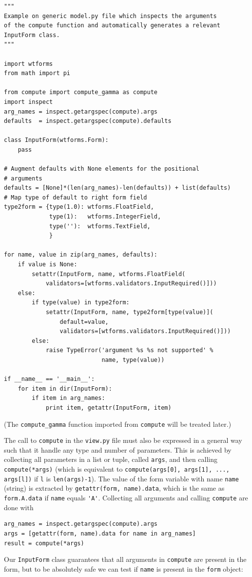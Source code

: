 \documentclass[%
oneside,                 %
final,                   %
10pt]{article}
\begin{document}
\begin{Verbatim}[numbers=none,fontsize=\fontsize{9pt}{9pt},baselinestretch=0.85]
"""
Example on generic model.py file which inspects the arguments
of the compute function and automatically generates a relevant
InputForm class.
"""

import wtforms
from math import pi

from compute import compute_gamma as compute
import inspect
arg_names = inspect.getargspec(compute).args
defaults  = inspect.getargspec(compute).defaults

class InputForm(wtforms.Form):
    pass

# Augment defaults with None elements for the positional
# arguments
defaults = [None]*(len(arg_names)-len(defaults)) + list(defaults)
# Map type of default to right form field
type2form = {type(1.0): wtforms.FloatField,
             type(1):   wtforms.IntegerField,
             type(''):  wtforms.TextField,
             }

for name, value in zip(arg_names, defaults):
    if value is None:
        setattr(InputForm, name, wtforms.FloatField(
            validators=[wtforms.validators.InputRequired()]))
    else:
        if type(value) in type2form:
            setattr(InputForm, name, type2form[type(value)](
                default=value,
                validators=[wtforms.validators.InputRequired()]))
        else:
            raise TypeError('argument %s %s not supported' %
                            name, type(value))

if __name__ == '__main__':
    for item in dir(InputForm):
        if item in arg_names:
            print item, getattr(InputForm, item)
\end{Verbatim}
(The \Verb!compute_gamma! function imported from \Verb!compute! will be treated later.)

The call to \Verb!compute! in the \Verb!view.py! file must also be expressed
in a general way such that it handle any type and number of
parameters. This is achieved by collecting all parameters in
a list or tuple, called \Verb!args!, and then calling \Verb!compute(*args)!
(which is equivalent to \Verb!compute(args[0], args[1], ..., args[l])!
if \Verb!l! is \Verb!len(args)-1!). The value of the form variable with
name \Verb!name! (string) is extracted by \Verb!getattr(form, name).data!,
which is the same as \Verb!form.A.data! if \Verb!name! equals \Verb!'A'!.
Collecting all arguments and calling \Verb!compute! are done with

\begin{Verbatim}[numbers=none,fontsize=\fontsize{9pt}{9pt},baselinestretch=0.85]
arg_names = inspect.getargspec(compute).args
args = [getattr(form, name).data for name in arg_names]
result = compute(*args)
\end{Verbatim}
Our \Verb!InputForm! class guarantees that all arguments in \Verb!compute!
are present in the form, but to be absolutely safe we can
test if \Verb!name! is present in the \Verb!form! object:
\end{document}
